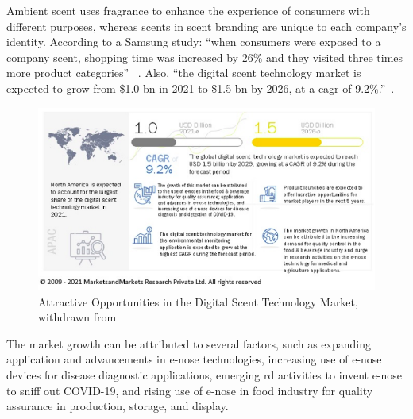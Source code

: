 Ambient scent uses fragrance to enhance the experience of consumers with different purposes, whereas scents in scent branding are unique to each company's identity.
According to a Samsung study: ``when consumers were exposed to a company scent, shopping time was increased by 26\% and they visited three times more product categories'' ~\cite{scent-stats}.
Also, ``the digital scent technology market is expected to grow from \$1.0 \gls{bn} in 2021 to \$1.5 \gls{bn} by 2026, at a \gls{cagr} of 9.2\%.''~\cite{scent-money}.
%
\begin{figure}[htb!]
\centering
    \includegraphics[width=0.9\columnwidth]{./img/scentstats.png}
  \caption{Attractive Opportunities in the Digital Scent Technology Market, withdrawn from~\cite{scent-money}}%
\label{fig:scent-stat}
\end{figure}

The market growth can be attributed to several factors, such as expanding application and advancements in e-nose technologies, increasing use of e-nose devices for disease diagnostic applications, emerging \gls{rd} activities to invent e-nose to sniff out COVID-19, and rising use of e-nose in food industry for quality assurance in production, storage, and display.
%
%
%
%
%
